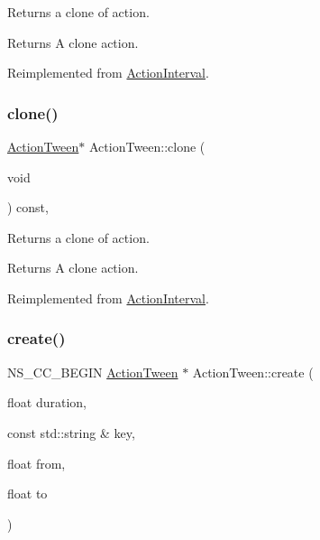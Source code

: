 Returns a clone of action.

\begin{DoxyReturn}{Returns}
A clone action. 
\end{DoxyReturn}


Reimplemented from \hyperlink{classActionInterval_abc93ce0c2f54a90eb216a7803f25f44a}{Action\+Interval}.

\mbox{\label{classActionTween_aa0eb9ca9073fb3ff7040698029bb49ff}} 
\subsubsection{\texorpdfstring{clone()}{clone()}\hspace{0.1cm}{\footnotesize\ttfamily [2/2]}}
{\footnotesize\ttfamily \hyperlink{classActionTween}{Action\+Tween}$\ast$ Action\+Tween\+::clone (\begin{DoxyParamCaption}\item[{void}]{ }\end{DoxyParamCaption}) const\hspace{0.3cm}{\ttfamily [override]}, {\ttfamily [virtual]}}

Returns a clone of action.

\begin{DoxyReturn}{Returns}
A clone action. 
\end{DoxyReturn}


Reimplemented from \hyperlink{classActionInterval_abc93ce0c2f54a90eb216a7803f25f44a}{Action\+Interval}.

\mbox{\label{classActionTween_ac687f53bff3399fef691582730a185e8}} 
\subsubsection{\texorpdfstring{create()}{create()}\hspace{0.1cm}{\footnotesize\ttfamily [1/2]}}
{\footnotesize\ttfamily N\+S\+\_\+\+C\+C\+\_\+\+B\+E\+G\+IN \hyperlink{classActionTween}{Action\+Tween} $\ast$ Action\+Tween\+::create (\begin{DoxyParamCaption}\item[{float}]{duration,  }\item[{const std\+::string \&}]{key,  }\item[{float}]{from,  }\item[{float}]{to }\end{DoxyParamCaption})\hspace{0.3cm}{\ttfamily [static]}}



